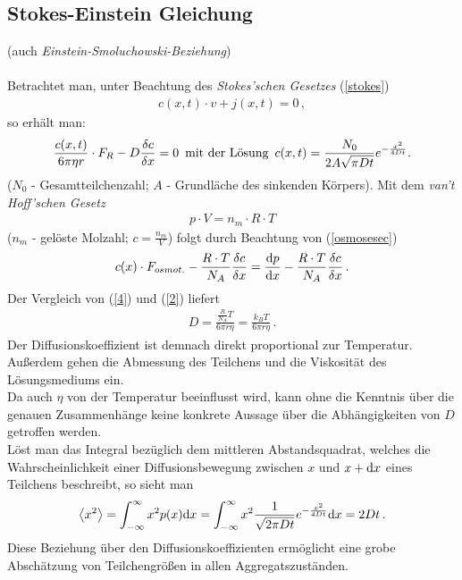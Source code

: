 \documentclass[numbers=noenddot,12pt,a4paper]{scrartcl}
\newcommand{\diff}{\textnormal{d}}
\newcommand{\tilt}[1]{\textit{#1}}
\newcommand{\euler}{\mathnormal{e}}
\begin{document}
\subsection{Stokes-Einstein Gleichung}(auch \tilt{Einstein-Smoluchowski-Beziehung}) \\ \\
Betrachtet man, unter Beachtung des \tilt{Stokes'schen Gesetzes} (\ref{stokes})
\begin{align*}
c(x,t)\cdot v + j(x,t)=0 \, ,
\end{align*}
so erhält man:
\begin{align}
\frac{c(x,t)}{6\pi\eta r}\cdot F_R - D\frac{\delta c}{\delta x}=0 \label{2} \, \text{ mit der Lösung } \, c(x,t)=\frac{N_0}{2A\sqrt{\pi Dt}}\euler^{-\frac{x^2}{4Dt}}.
\end{align}
($N_0$ - Gesamtteilchenzahl; $A$ - Grundläche des sinkenden Körpers). Mit dem \tilt{van't Hoff'schen Gesetz}
\begin{align}
p\cdot V= n_m \cdot R \cdot T
\end{align}
($n_m$ - gelöste Molzahl; $c=\frac{n_m}{V}$) folgt durch Beachtung von (\ref{osmosesec})
\begin{align}
c(x)\cdot F_{osmot.}-\frac{R\cdot T}{N_A}\frac{\delta c}{\delta x}=\frac{\diff p}{\diff x}-\frac{R\cdot T}{N_A}\frac{\delta c}{\delta x} \label{4} \, .
\end{align}
Der Vergleich von (\ref{4}) und (\ref{2}) liefert
\begin{align}
D=\frac{\frac{R}{N_A}T}{6\pi r\eta}=\frac{k_B T}{6\pi r\eta} \, .
\end{align}
Der Diffusionskoeffizient ist demnach direkt proportional zur Temperatur. Außerdem gehen die Abmessung des Teilchens und die Viskosität des Lösungsmediums ein.\\
Da auch $\eta$ von der Temperatur beeinflusst wird, kann ohne die Kenntnis über die genauen Zusammenhänge keine konkrete Aussage über die Abhängigkeiten von $D$ getroffen werden.\\
Löst man das Integral bezüglich dem mittleren Abstandsquadrat, welches die Wahrscheinlichkeit einer Diffusionsbewegung zwischen $x$ und $x+\diff x$ eines Teilchens beschreibt, so sieht man
\begin{align}
\left\langle x^2\right\rangle=\int_{-\infty}^{\infty} x^2 p(x)\diff x=\int_{-\infty}^{\infty} x^2 \frac{1}{\sqrt{2\pi Dt}}\euler^{-\frac{x^2}{4 Dt}}\diff x=2 Dt \, .
\end{align}
Diese Beziehung über den Diffusionskoeffizienten ermöglicht eine grobe Abschätzung von Teilchengrößen in allen Aggregatszuständen.
\end{document}

